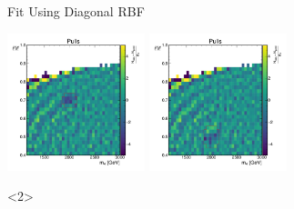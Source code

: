 \documentclass[10pt]{beamer}
\begin{document}
\begin{frame}{Fit Using Diagonal RBF}
\begin{center}
    \includegraphics[width=0.3\textwidth]{figures/2dpullplots/rbf/E_2000_0p7_150_0p05.pdf} 
    \includegraphics[width=0.3\textwidth]{figures/2dpullplots/rbf/E_2000_0p5_150_0p07.pdf} 
  \end{center}
  \begin{onlyenv}<2>
  \end{onlyenv}
\end{frame}
\end{document}

